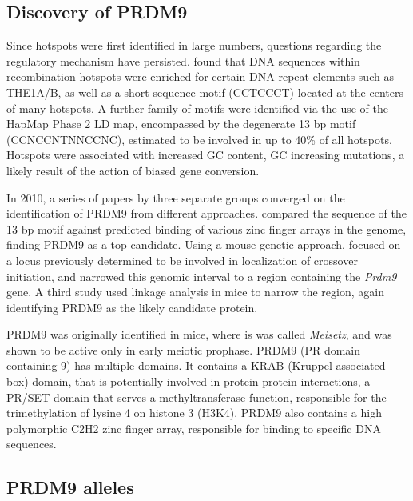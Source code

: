 \subsection{Discovery of PRDM9}

Since hotspots were first identified in large numbers, questions regarding the regulatory mechanism have persisted.
\citet{Myers2005} found that DNA sequences within recombination hotspots were enriched for certain DNA repeat elements such as THE1A/B, as well as a short sequence motif (CCTCCCT) located at the centers of many hotspots.
A further family of motifs were identified via the use of the HapMap Phase 2 LD map\cite{hapmap2007}, encompassed by the degenerate 13 bp motif (CCNCCNTNNCCNC)\cite{Myers2008}, estimated to be involved in up to 40\% of all hotspots.
Hotspots were associated with increased GC content, GC increasing mutations, a likely result of the action of biased gene conversion\cite{Spencer2006}.


In 2010, a series of papers by three separate groups converged on the identification of PRDM9 from different approaches.
\citet{Myers2010} compared the sequence of the 13 bp motif against predicted binding of various zinc finger arrays in the genome, finding PRDM9 as a top candidate.
Using a mouse genetic approach, \citet{Baudat2010} focused on a locus previously determined to be involved in localization of crossover initiation\cite{Grey2009,Parvanov2009},
and narrowed this genomic interval to a region containing the \textit{Prdm9} gene.
A third study used linkage analysis in mice to narrow the region, again identifying PRDM9 as the likely candidate protein\cite{Parvanov2010}.

PRDM9 was originally identified in mice, where is was called \textit{Meisetz}, and was shown to be active only in early meiotic prophase\cite{Hayashi2005}.
PRDM9 (PR domain containing 9) has multiple domains.
It contains a KRAB (Kruppel-associated box) domain, that is potentially involved in protein-protein interactions, a PR/SET domain that serves a methyltransferase function, responsible for the trimethylation of lysine 4 on histone 3 (H3K4)\cite{Hayashi2005}.
PRDM9 also contains a high polymorphic C2H2 zinc finger array, responsible for binding to specific DNA sequences\cite{Hayashi2005}. 

\subsection{PRDM9 alleles}

